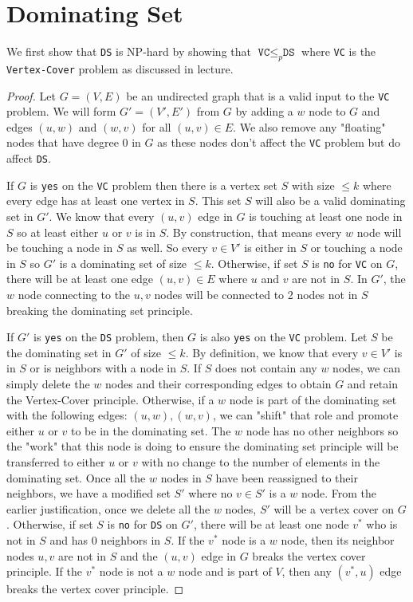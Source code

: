 \documentclass{article}
\begin{document}
\section{Dominating Set}
We first show that \texttt{DS} is NP-hard by showing that $\texttt{VC} \leq_p \texttt{DS}$ where \texttt{VC} is the \texttt{Vertex-Cover} problem as discussed in lecture.
\begin{proof}
    Let $G = (V, E)$ be an undirected graph that is a valid input to the \texttt{VC} problem.
    We will form $G' = (V', E')$ from $G$ by adding a $w$ node to $G$ and edges $(u, w)$ and $(w, v)$ for all $(u, v) \in E$.
    We also remove any "floating" nodes that have degree 0 in $G$ as these nodes don't affect the \texttt{VC} problem but do affect \texttt{DS}.

    If $G$ is \texttt{yes} on the \texttt{VC} problem then there is a vertex set $S$ with size $\leq k$ where every edge has at least one vertex in $S$.
    This set $S$ will also be a valid dominating set in $G'$. We know that every $(u, v)$ edge in $G$ is touching at least one node in $S$ so at least either $u$ or $v$ is in $S$.
    By construction, that means every $w$ node will be touching a node in $S$ as well.
    So every $v \in V'$ is either in $S$ or touching a node in $S$ so $G'$ is a dominating set of size $\leq k$.
    Otherwise, if set $S$ is \texttt{no} for \texttt{VC} on $G$, there will be at least one edge $(u, v) \in E$ where $u$ and $v$ are not in $S$.
    In $G'$, the $w$ node connecting to the $u, v$ nodes will be connected to 2 nodes not in $S$ breaking the dominating set principle.

    If $G'$ is \texttt{yes} on the \texttt{DS} problem, then $G$ is also \texttt{yes} on the \texttt{VC} problem.
    Let $S$ be the dominating set in $G'$ of size $\leq k$. By definition, we know that every $v \in V'$ is in $S$ or is neighbors with a node in $S$.
    If $S$ does not contain any $w$ nodes, we can simply delete the $w$ nodes and their corresponding edges to obtain $G$ and retain the Vertex-Cover principle.
    Otherwise, if a $w$ node is part of the dominating set with the following edges: $(u, w), (w, v)$, we can "shift" that role and promote either $u$ or $v$ to be in the dominating set.
    The $w$ node has no other neighbors so the "work" that this node is doing to ensure the dominating set principle will be transferred to either $u$ or $v$ with no change to the number of elements in the dominating set.
    Once all the $w$ nodes in $S$ have been reassigned to their neighbors, we have a modified set $S'$ where no $v \in S'$ is a $w$ node.
    From the earlier justification, once we delete all the $w$ nodes, $S'$ will be a vertex cover on $G$.
    Otherwise, if set $S$ is \texttt{no} for \texttt{DS} on $G'$, there will be at least one node $v^*$ who is not in $S$ and has 0 neighbors in $S$.
    If the $v^*$ node is a $w$ node, then its neighbor nodes $u, v$ are not in $S$ and the $(u, v)$ edge in $G$ breaks the vertex cover principle.
    If the $v^*$ node is not a $w$ node and is part of $V$, then any $(v^*, u)$ edge breaks the vertex cover principle.


\end{proof}
\end{document}
